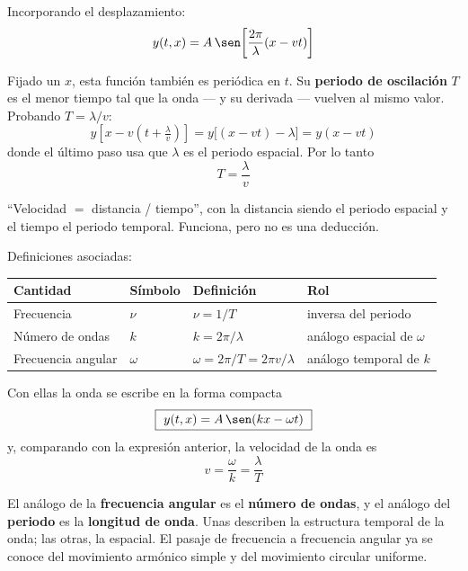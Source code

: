 \documentclass[12pt,a4paper]{article}
\begin{document}
Incorporando el desplazamiento:
\[
y(t,x) = A\,\sen\!\left[\frac{2\pi}{\lambda}(x - vt)\right]
\]

Fijado un $x$, esta función también es periódica en $t$. Su \textbf{periodo
de oscilación} $T$ es el menor tiempo tal que la onda --- y su derivada ---
vuelven al mismo valor. Probando $T = \lambda/v$:
\[
y\!\left[x - v\!\left(t + \tfrac{\lambda}{v}\right)\right]
 = y\big[(x - vt) - \lambda\big] = y(x - vt)
\]
donde el último paso usa que $\lambda$ es el periodo espacial. Por lo tanto
\[
\boxed{\ T = \frac{\lambda}{v}\ }
\]

\begin{notebox}
\enquote{Velocidad $=$ distancia / tiempo}, con la distancia siendo el
periodo espacial y el tiempo el periodo temporal. Funciona, pero no es una
deducción.
\end{notebox}



Definiciones asociadas:

\begin{table}[H]
\centering
\begin{tabular}{llll}
\toprule
\textbf{Cantidad} & \textbf{Símbolo} & \textbf{Definición} & \textbf{Rol} \\
\midrule
Frecuencia         & $\nu$    & $\nu = 1/T$
  & inversa del periodo \\
Número de ondas    & $k$      & $k = 2\pi/\lambda$
  & análogo espacial de $\omega$ \\
Frecuencia angular & $\omega$ & $\omega = 2\pi/T = 2\pi v/\lambda$
  & análogo temporal de $k$ \\
\bottomrule
\end{tabular}
\end{table}

Con ellas la onda se escribe en la forma compacta
\[
\boxed{\ y(t,x) = A\,\sen(kx - \omega t)\ }
\]
y, comparando con la expresión anterior, la velocidad de la onda es
\[
\boxed{\ v = \frac{\omega}{k} = \frac{\lambda}{T}\ }
\]

\begin{notebox}
El análogo de la \textbf{frecuencia angular} es el \textbf{número de ondas},
y el análogo del \textbf{periodo} es la \textbf{longitud de onda}. Unas
describen la estructura temporal de la onda; las otras, la espacial. El
pasaje de frecuencia a frecuencia angular ya se conoce del movimiento
armónico simple y del movimiento circular uniforme.
\end{notebox}
\end{document}
